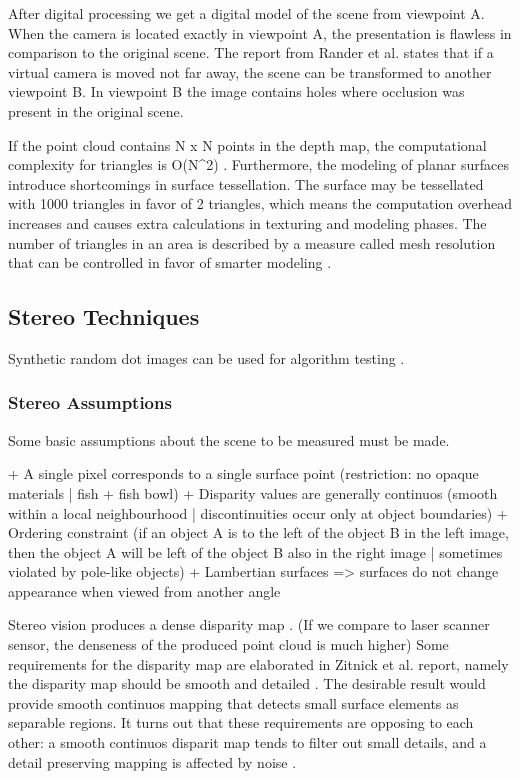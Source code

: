 \documentclass[12pt,a4paper,oneside,pdftex]{report}
\begin{document}
After digital processing we get a digital model of the scene from viewpoint A. When the camera is located exactly in viewpoint A, the presentation is flawless in comparison to the original scene. The report from Rander et al. \cite{Rander97} states that if a virtual camera is moved not far away, the scene can be transformed to another viewpoint B. In viewpoint B the image contains holes where occlusion was present in the original scene.

If the point cloud contains N x N points in the depth map, the computational complexity for triangles is O(N^2) \cite{Rander97}. Furthermore, the modeling of planar surfaces introduce shortcomings in surface tessellation. The surface may be tessellated with 1000 triangles in favor of 2 triangles, which means the computation overhead increases and causes extra calculations in texturing and modeling phases. The number of triangles in an area is described by a measure called mesh resolution that can be controlled in favor of smarter modeling \cite{Johnson96}.

\subsection{Stereo Techniques}

Synthetic random dot images can be used for algorithm testing \cite{Zitnick00}.

\subsubsection{Stereo Assumptions}

Some basic assumptions about the scene to be measured must be made.

+ A single pixel corresponds to a single surface point (restriction: no opaque materials | fish + fish bowl)
+ Disparity values are generally continuos (smooth within a local neighbourhood | discontinuities occur only at object boundaries)
+ Ordering constraint (if an object A is to the left of the object B in the left image, then the object A will be left of the object B also in the right image | sometimes violated by pole-like objects)
+ Lambertian surfaces => surfaces do not change appearance when viewed from another angle

Stereo vision produces a dense disparity map . (If we compare to laser scanner sensor, the denseness of the produced point cloud is much higher)
Some requirements for the disparity map are elaborated in Zitnick et al. report, namely the disparity map should be smooth and detailed . The desirable result would provide smooth continuos mapping that detects small surface elements as separable regions. It turns out that these requirements are opposing to each other: a smooth continuos disparit map tends to filter out small details, and a detail preserving mapping is affected by noise \cite{Zitnick00}.
\end{document}
